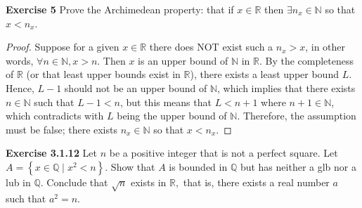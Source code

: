 \documentclass[12pt]{article}
\newcommand{\bbN}{\mathbb{N}}
\newcommand{\bbQ}{\mathbb{Q}}
\newcommand{\bbR}{\mathbb{R}}
\theoremstyle{definition}
\numberwithin{equation}{subsection}
\begin{document}
\textbf{Exercise 5} Prove the Archimedean property: that if
$x \in \bbR$ then $\exists n_x \in \bbN$ so that
$x < n_x$.
\begin{proof}
Suppose for a given $x \in \bbR$ there does NOT exist such a $n_x > x$,
in other words, $\forall n \in \bbN, x > n$. Then $x$ is an upper bound of
$\bbN$ in $\bbR$. By the completeness of $\bbR$ (or that least upper bounds exist in $\bbR$), there exists a least upper bound $L$. Hence, $L - 1$ should not be an upper bound of $\bbN$, which implies that there exists $n \in \bbN$ such that $L-1<n$, but this means that $L < n+1$ where $n+1 \in \bbN$, which contradicts with $L$ being the upper bound of $\bbN$. Therefore, the assumption must be false; there exists $n_x \in \bbN$ so that $x < n_x$.
\end{proof}

\textbf{Exercise 3.1.12} Let $n$ be a positive integer that is not a perfect square.
Let $A=\left\{x \in \mathbb{Q} \mid x^{2}<n\right\} .$ Show that $A$ is bounded in $\bbQ$ but has neither
a glb nor a lub in $\bbQ$. Conclude that $\sqrt{n}$ exists in $\mathbb{R},$ that is, there exists a
real number $a$ such that $a^{2}=n .$
\end{document}
